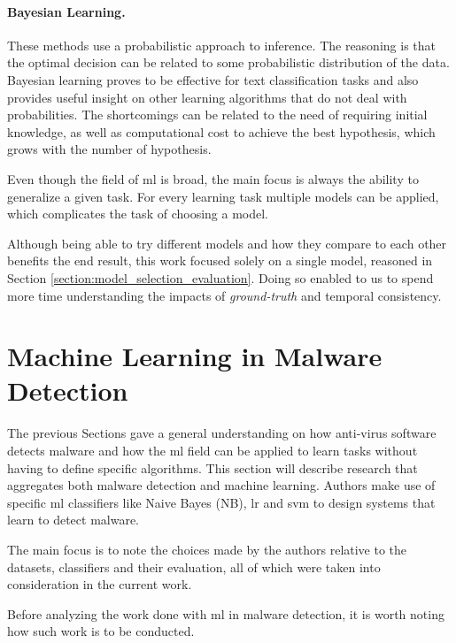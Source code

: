 \paragraph{Bayesian Learning.~\cite{mitchell:ml}} These methods use a probabilistic approach to inference.
The reasoning is that the optimal decision can be related to some probabilistic distribution of the data.
Bayesian learning proves to be effective for text classification tasks and also provides useful insight on other learning algorithms that do not deal with probabilities.
The shortcomings can be related to the need of requiring initial knowledge, as well as computational cost to achieve the best hypothesis, which grows with the number of hypothesis.

\medskip

Even though the field of \gls{ml} is broad, the main focus is always the ability to generalize a given task.
For every learning task multiple models can be applied, which complicates the task of choosing a model.

Although being able to try different models and how they compare to each other benefits the end result, this work focused solely on a single model, reasoned in Section \ref{section:model_selection_evaluation}.
Doing so enabled to us to spend more time understanding the impacts of \textit{ground-truth} and temporal consistency.

\section{Machine Learning in Malware Detection}
\label{section:ml_md}

The previous Sections gave a general understanding on how anti-virus software detects malware and how the \gls{ml} field can be applied to learn tasks without having to define specific algorithms.
This section will describe research that aggregates both malware detection and machine learning.
Authors make use of specific \gls{ml} classifiers like Naive Bayes (NB), \gls{lr} and \gls{svm} to design systems that learn to detect malware.

The main focus is to note the choices made by the authors relative to the datasets, classifiers and their evaluation, all of which were taken into consideration in the current work.

Before analyzing the work done with \gls{ml} in malware detection, it is worth noting how such work is to be conducted.

